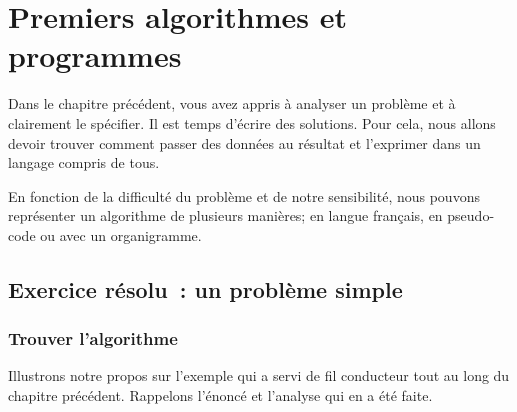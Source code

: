 \chapter{Premiers algorithmes et programmes}

	Dans le chapitre précédent, vous avez appris à analyser un problème et
	à clairement le spécifier.  Il est temps d’écrire des solutions.  Pour cela,
	nous allons devoir trouver comment passer des données au résultat et
	l’exprimer dans un langage compris de tous.
	
	En fonction de la difficulté du problème et de notre sensibilité, nous
	pouvons représenter un algorithme de plusieurs manières; en langue français,
	en pseudo-code ou avec un organigramme. 

	\minitoc
	
	\section{Exercice résolu~: un problème simple}
	
		\subsection{Trouver l’algorithme}

			Illustrons notre propos sur l’exemple qui a servi de fil conducteur
			tout au long du chapitre précédent.  Rappelons l’énoncé et l’analyse
			qui en a été faite.
			
